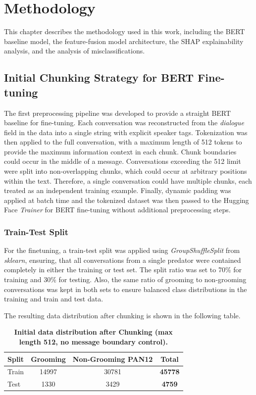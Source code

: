 \chapter{Methodology} \label{sec:methodology}
This chapter describes the methodology used in this work, including the BERT baseline model, the feature-fusion model architecture, the SHAP explainability analysis, and the analysis of misclassifications.
\section{Initial Chunking Strategy for BERT Fine-tuning}

The first preprocessing pipeline was developed to provide a straight BERT baseline for fine-tuning. Each conversation was reconstructed from the \textit{dialogue} field in the data into a single string with explicit speaker tags. Tokenization was then applied to the full conversation, with a maximum length of 512 tokens to provide the maximum information context in each chunk. Chunk boundaries could occur in the middle of a message. Conversations exceeding the 512 limit were split into non-overlapping chunks, which could occur at arbitrary positions within the text. Therefore, a single conversation could have multiple chunks, each treated as an independent training example. Finally, dynamic padding was applied at batch time and the tokenized dataset was then passed to the Hugging Face \textit{Trainer} for BERT fine-tuning without additional preprocessing steps.


\subsection{Train-Test Split}
For the finetuning, a train-test split was applied using \textit{GroupShuffleSplit} from \textit{sklearn}, ensuring, that all conversations from a single predator were contained completely in either the training or test set.  The split ratio was set to 70\% for training and 30\% for testing. Also, the same ratio of grooming to non-grooming conversations was kept in both sets to ensure balanced class distributions in the training and train and test data.

The resulting data distribution after chunking is shown in the following table.

\begin{table}[H] 
\label{tab:initial_split} 
\centering
\small
\caption[Initial data distribution after chunking]{\textbf{Initial data distribution after Chunking (max length 512, no message boundary control).}}
\begin{tabular}{lccc}
\hline
Split & Grooming & Non-Grooming PAN12  & \textbf{Total} \\
\hline
Train & 14997 & 30781  & \textbf{45778} \\
Test  & 1330 & 3429   & \textbf{4759} \\
\end{tabular}
\end{table}

